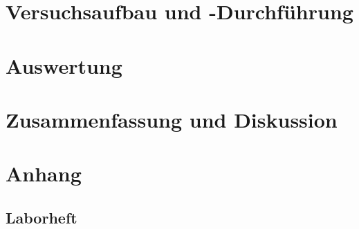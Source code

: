\documentclass[12pt]{article}
\begin{document}
\newpage
\section{Versuchsaufbau und -Durchführung}




\newpage
\section{Auswertung}


\newpage
\section{Zusammenfassung und Diskussion}


\newpage
\section{Anhang}




%


%

\subsection{Laborheft}

\newpage
\listoffigures

\end{document}
